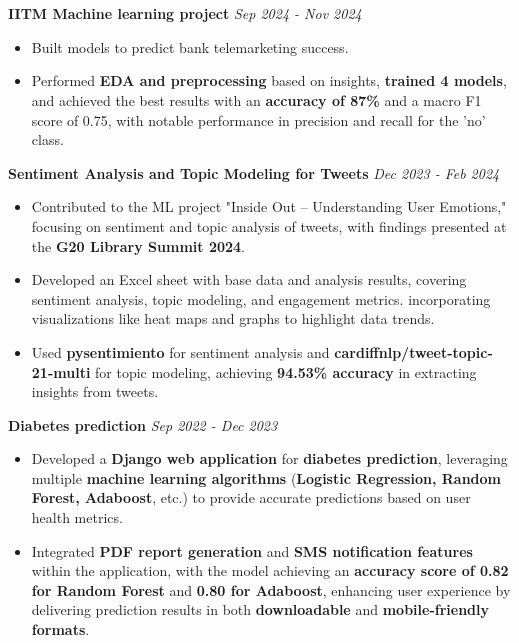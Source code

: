 \documentclass[a4paper,10pt]{article}
\begin{document}
\section{\scshape\color{Fuchsia}{\faLaptopCode\ \textbf PROJECTS}}
\textbf{IITM Machine learning project} \href{https://github.com/ShreehariA/IITM_MLP_Project}{} \hfill \textit{Sep 2024 - Nov 2024}
\vspace{-2mm}
\begin{itemize}
    \item Built models to predict bank telemarketing success.
    \vspace{-2mm}
    \item Performed \textbf{EDA and preprocessing} based on insights, \textbf{trained 4 models}, and achieved the best results with an \textbf{accuracy of 87\%} and a macro F1 score of 0.75, with notable performance in precision and recall for the 'no' class.
\end{itemize}
\vspace{-2mm}
\textbf{Sentiment Analysis and Topic Modeling for Tweets} \href{https://github.com/ShreehariA/G20_Library_Summit}{} \hfill \textit{Dec 2023 - Feb 2024}
\vspace{-2mm}
\begin{itemize}
    \item Contributed to the ML project "Inside Out – Understanding User Emotions," focusing on sentiment and topic analysis of tweets, with findings presented at the \textbf{G20 Library Summit 2024}.
    \vspace{-2mm}
    \item Developed an Excel sheet with base data and analysis results, covering sentiment analysis, topic modeling, and engagement metrics. incorporating visualizations like heat maps and graphs to highlight data trends.
    \vspace{-2mm}
    \item Used \textbf{pysentimiento} for sentiment analysis and \textbf{cardiffnlp/tweet-topic-21-multi} for topic modeling, achieving \textbf{94.53\% accuracy} in extracting insights from tweets.
\end{itemize}
\vspace{-2mm}
\textbf{Diabetes prediction} \href{https://github.com/ShreehariA/diabetes-pred}{} \hfill \textit{Sep 2022 - Dec 2023}
\vspace{-2mm}
\begin{itemize}
    \item Developed a \textbf{Django web application} for \textbf{diabetes prediction}, leveraging multiple \textbf{machine learning algorithms} (\textbf{Logistic Regression, Random Forest, Adaboost}, etc.) to provide accurate predictions based on user health metrics.
    \vspace{-2mm}
    \item Integrated \textbf{PDF report generation} and \textbf{SMS notification features} within the application, with the model achieving an \textbf{accuracy score of 0.82 for Random Forest} and \textbf{0.80 for Adaboost}, enhancing user experience by delivering prediction results in both \textbf{downloadable} and \textbf{mobile-friendly formats}.
\end{itemize}
\end{document}
